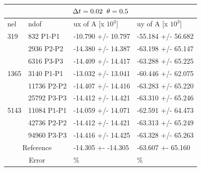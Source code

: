 \begin{table}[h!]
\centering
\label{CSM 3 Results}
\begin{tabular}{ |p{1cm}||p{2.7cm}|p{3.3cm}|p{3.3cm}|}
\hline
  \multicolumn{4}{|c|}{$\Delta t = 0.02 \hspace{2mm} \theta = 0.5$} \\
\hline
nel & ndof & ux of A [x $10^{3}$]  &uy of A [x $10^{3}$] \\
\hline
 319     & 832 P1-P1  & -10.790       +/-  10.797 & -55.184       +/-  56.682 \\
     & 2936 P2-P2 & -14.380       +/-  14.387 & -63.198       +/-  65.147 \\
      & 6316 P3-P3 & -14.409       +/-  14.417 & -63.288       +/-  65.225 \\
  \hline
   1365    & 3140 P1-P1 & -13.032       +/-  13.041 & -60.446       +/-  62.075 \\
     & 11736 P2-P2 & -14.407       +/-  14.416 & -63.283       +/-  65.220 \\
     & 25792 P3-P3 & -14.412       +/-  14.421 & -63.310       +/-  65.246 \\
   \hline
    5143    & 11084 P1-P1 & -14.059       +/-  14.071 & -62.591       +/-  64.473 \\
     & 42736 P2-P2  & -14.412       +/-  14.421 & -63.313       +/-  65.249 \\
     & 94960 P3-P3 & -14.416       +/-  14.425 & -63.328       +/-  65.263 \\
    \hline
  \multicolumn{2}{|c|}{Reference}  &-14.305 +- -14.305        & -63.607 +- 65.160    \\
   \hline
    \multicolumn{2}{|c|}{Error}  & \%   &  \%\\
   \hline
\end{tabular}
\end{table}

